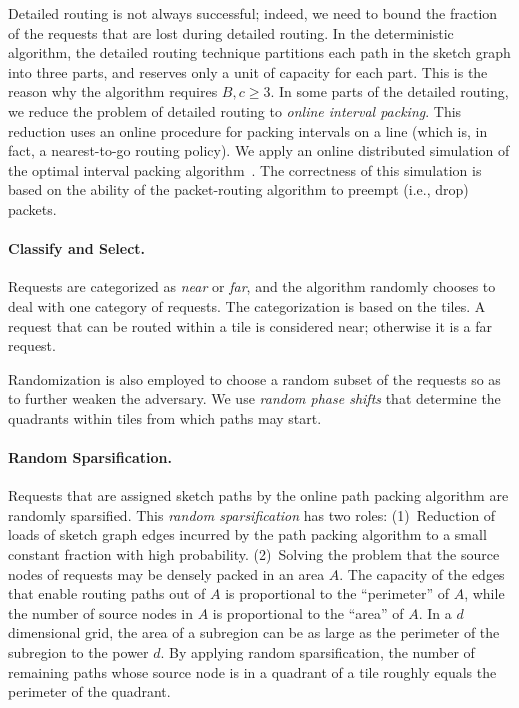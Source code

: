 \documentclass[11pt]{article}
\newenvironment{proof sketch}[1]{\noindent {\emph{Proof sketch of #1:}}}{\hfill \qed}
\begin{document}
Detailed routing is not always successful; indeed, we need to bound the fraction of
the requests that are lost during detailed routing.  In the deterministic algorithm,
the detailed routing technique partitions each path in the sketch graph into three
parts, and reserves only a unit of capacity for each part. This is the reason why the
algorithm requires $B,c \geq 3$.  In some parts of the detailed routing, we reduce
the problem of detailed routing to \emph{online interval packing}.  This reduction
uses an online procedure for packing intervals on a line (which is, in fact, a
nearest-to-go routing policy). We apply an online distributed simulation of the
optimal interval packing algorithm~\cite{GLL}. The correctness of this simulation is
based on the ability of the packet-routing algorithm to preempt (i.e., drop) packets.

\paragraph{Classify and Select.}
Requests are categorized as \emph{near} or \emph{far}, and the algorithm randomly chooses to deal
with one category of requests.
The categorization is based on the tiles. A request that can be routed within a tile
is considered near; otherwise it is a far request.

Randomization is also employed to choose a random subset of the requests so as to
further weaken the adversary. We use \emph{random phase shifts} that determine the quadrants
within tiles from which paths may start.


\paragraph{Random Sparsification.}
Requests that are assigned
sketch paths by the online path packing algorithm are randomly sparsified. This
\emph{random sparsification} has two roles: (1)~Reduction of loads of sketch graph edges
incurred by the path packing algorithm to a small constant fraction with high
probability.  (2)~Solving the problem that the source nodes of requests may be
densely packed in an area $A$.  The capacity of the edges that enable routing paths
out of $A$ is proportional to the ``perimeter'' of $A$, while the number of source
nodes in $A$ is proportional to the ``area'' of $A$.  In a $d$ dimensional grid, the
area of a subregion can be as large as the perimeter of the subregion to the power
$d$.  By applying random sparsification, the number of remaining paths whose source
node is in a quadrant of a tile roughly equals the perimeter of the quadrant.
\end{document}
